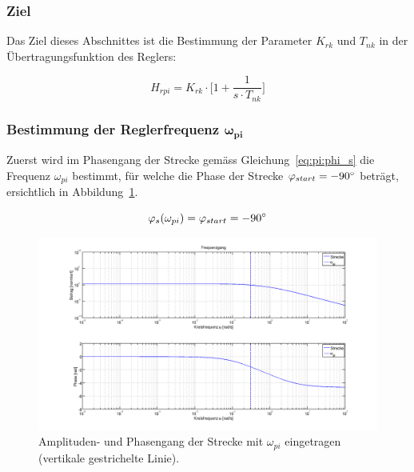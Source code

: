 \subsubsection*{Ziel}
Das  Ziel dieses  Abschnittes ist  die Bestimmung  der Parameter  $K_{rk}$ und
$T_{nk}$ in der \"Ubertragungsfunktion des Reglers:

\begin{equation} \label{eq:pi:target}
    H_{rpi} = K_{rk} \cdot \biggl[ 1 + \frac{1}{s \cdot T_{nk}} \biggr]
\end{equation}


\subsubsection{Bestimmung der Reglerfrequenz $\mathbf{\boldsymbol{\omega}_{pi}}$}

Zuerst  wird im  Phasengang der  Strecke gem\"ass  Gleichung~\ref{eq:pi:phi_s}
die   Frequenz   $\omega_{pi}$   bestimmt,   f\"ur  welche   die   Phase   der
Strecke   $\varphi_{start}    =   -90\degree$   betr\"agt,    ersichtlich   in
Abbildung~\ref{fig:pi:omega_pi}\footnotemark[4].

\begin{equation} \label{eq:pi:phi_s}
    \varphi_s(\omega_{pi}) = \varphi_{start} = -90 \degree
\end{equation}


\begin{figure}[h! width=\pagewidth]
    \includegraphics[width=\textwidth]{images/piStreckeOmegaPI.png}
    \caption{%
        Amplituden- und  Phasengang der Strecke mit  $\omega_{pi}$ eingetragen
        (vertikale gestrichelte Linie).
    }
    \label{fig:pi:omega_pi}
\end{figure}

